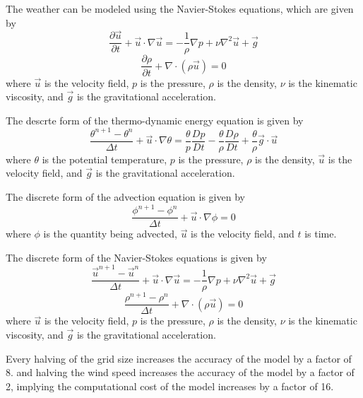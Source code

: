 \documentclass{article}
\begin{document}
The weather can be modeled using the Navier-Stokes equations, which are given by
\begin{equation}
\frac{\partial \vec{u}}{\partial t} + \vec{u} \cdot \nabla \vec{u} = -\frac{1}{\rho} \nabla p + \nu \nabla^2 \vec{u} + \vec{g}
\end{equation}
\begin{equation}
\frac{\partial \rho}{\partial t} + \nabla \cdot (\rho \vec{u}) = 0
\end{equation}
where $\vec{u}$ is the velocity field, $p$ is the pressure, $\rho$ is the density, $\nu$ is the kinematic viscosity, and $\vec{g}$ is the gravitational acceleration.

The descrte form of the thermo-dynamic energy equation is given by
\begin{equation}
\frac{\theta^{n+1} - \theta^n}{\Delta t} + \vec{u} \cdot \nabla \theta = \frac{\theta}{p} \frac{D p}{D t} - \frac{\theta}{\rho} \frac{D \rho}{D t} + \frac{\theta}{\rho} \vec{g} \cdot \vec{u}
\end{equation}
where $\theta$ is the potential temperature, $p$ is the pressure, $\rho$ is the density, $\vec{u}$ is the velocity field, and $\vec{g}$ is the gravitational acceleration.

The discrete form of the advection equation is given by
\begin{equation}
\frac{\phi^{n+1} - \phi^n}{\Delta t} + \vec{u} \cdot \nabla \phi = 0
\end{equation}
where $\phi$ is the quantity being advected, $\vec{u}$ is the velocity field, and $t$ is time.

The discrete form of the Navier-Stokes equations is given by
\begin{equation}
\frac{\vec{u}^{n+1} - \vec{u}^n}{\Delta t} + \vec{u} \cdot \nabla \vec{u} = -\frac{1}{\rho} \nabla p + \nu \nabla^2 \vec{u} + \vec{g}
\end{equation}
\begin{equation}
\frac{\rho^{n+1} - \rho^n}{\Delta t} + \nabla \cdot (\rho \vec{u}) = 0
\end{equation}
where $\vec{u}$ is the velocity field, $p$ is the pressure, $\rho$ is the density, $\nu$ is the kinematic viscosity, and $\vec{g}$ is the gravitational acceleration.

Every halving of the grid size increases the accuracy of the model by a factor of 8. and halving the wind speed increases the accuracy of the model by a factor of 2, implying the computational cost of the model increases by a factor of 16.
\end{document}
